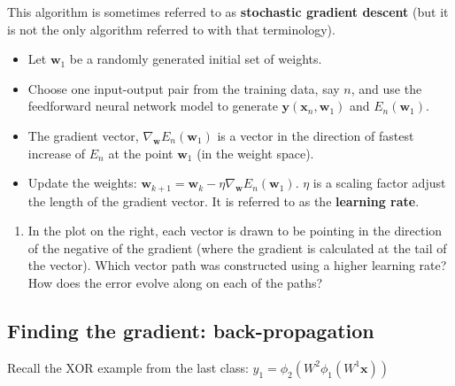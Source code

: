 \documentclass[12pt,letterpaper,noanswers]{exam}
\newcommand{\vc}[1]{\boldsymbol{#1}}
\begin{document}
\begin{tcolorbox}
This algorithm is sometimes referred to as \textbf{stochastic gradient descent} (but it is not the only algorithm referred to with that terminology).
\begin{itemize}
\itemsep0pt
    \item Let $\vc{w}_1$ be a randomly generated initial set of weights.
    \item Choose one input-output pair from the training data, say $n$, and use the feedforward neural network model to generate $\vc{y}(\vc{x}_n,\vc{w}_1)$ and $E_ n(\vc{w}_1)$.
\item The gradient vector, $\nabla_{\vc{w}}E_n(\vc{w}_1)$ is a vector in the direction of fastest increase of $E_n$ at the point $\vc{w}_1$ (in the weight space). 
\item Update the weights: $\vc{w}_{k+1} = \vc{w}_k - \eta\nabla_{\vc{w}}E_n(\vc{w}_1)$.  $\eta$ is a scaling factor adjust the length of the gradient vector.  It is referred to as the \textbf{learning rate}.
\end{itemize}
\end{tcolorbox}

\begin{enumerate}[resume=classQ]
 \item In the plot on the right, each vector is drawn to be pointing in the direction of the negative of the gradient (where the gradient is calculated at the tail of the vector).  Which vector path was constructed using a higher learning rate?  How does the error evolve along on each of the paths?
\end{enumerate}

\subsection*{Finding the gradient: back-propagation}

Recall the XOR example from the last class: $y_1 = \phi_2(W^2\phi_1(W^1\vc{x}))$
\end{document}

